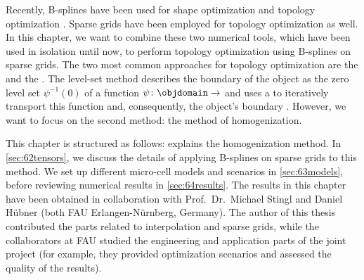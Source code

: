 Recently, B-splines have been used for
shape optimization \cite{Martin16Formoptimierung} and
topology optimization .
Sparse grids have been employed for
topology optimization \cite{Huebner14Mehrdimensionale} as well.
In this chapter, we want to combine these two numerical tools,
which have been used in isolation until now,
to perform topology optimization using B-splines on sparse grids.
The two most common approaches for topology optimization are
the  and
the  \cite{Allaire16Towards}.
The level-set method describes the boundary of the object
as the zero level set $\psi^{-1}(0)$ of a function
$\psi\colon \objdomain \to \real$ 
and uses a \pde to iteratively transport this function and,
consequently, the object's boundary \cite{Allaire04Topology}.
However, we want to focus on the second method:
the method of homogenization.

This chapter is structured as follows:
 explains the homogenization method.
In \cref{sec:62tensors}, we discuss the details of applying B-splines on
sparse grids to this method.
We set up different micro-cell models and scenarios in \cref{sec:63models},
before reviewing numerical results in \cref{sec:64results}.
The results in this chapter have been obtained in collaboration with
Prof.\ Dr.\ Michael Stingl and Daniel Hübner
(both FAU Erlangen-Nürnberg, Germany).
The author of this thesis contributed the parts related to
interpolation and sparse grids, while the collaborators at FAU
studied the engineering and application parts of the joint project
(for example, they provided optimization scenarios and
assessed the quality of the results).






\cleardoublepage
